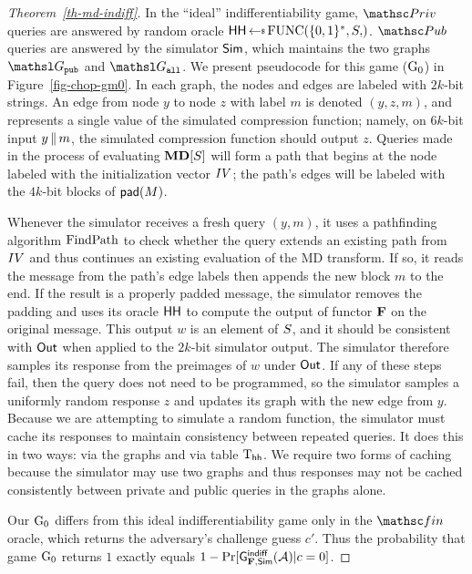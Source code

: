 \begin{proof}[Theorem~\ref{th-md-indiff}]
In the ``ideal'' indifferentiability game, $\PrivO$ queries are answered by random oracle $\HH\getsr \AllFuncs{\bits^*,\S}$.
$\PubO$ queries are answered by the simulator $\simulator$, which maintains the two graphs $\graph_{\public}$ and $\graph_{\all}$.
We present pseudocode for this game ($\Gm_0$) in Figure~\ref{fig-chop-gm0}.
In each graph, the nodes and edges are labeled with $2k$-bit strings.
An edge from node $y$ to node $z$ with label $m$ is denoted $(y, z, m)$, and represents a single value of the simulated compression function; namely, on $6k$-bit input $y \concat m$, the simulated compression function should output $z$.
Queries made in the process of evaluating $\construct{MD}[\S]$ will form a path that begins at the node labeled with the initialization vector $\IV$; the path's edges will be labeled with the $4k$-bit blocks of $\padF(\msg)$.
 
Whenever the simulator receives a fresh query $(y, m)$, it uses a pathfinding algorithm $\ppathO$ to check whether the query extends an existing path from $\IV$ and thus continues an
existing evaluation of the MD transform.
If so, it reads the message from the path's edge labels then appends the new block $m$ to the end.
If the result is a properly padded message, the simulator removes the padding and uses its oracle $\HH$ to compute the output of functor $\construct{F}$ on the original message.
This output $w$ is an element of $\S$, and it should be consistent with $\Out$ when applied to the $2k$-bit simulator output.
The simulator therefore samples its response from the preimages of $w$ under $\Out$.
If any of these steps fail, then the query does not need to be programmed, so the simulator samples a uniformly random response $z$ and updates its graph with the new edge from $y$.
Because we are attempting to simulate a random function, the simulator must cache its responses to maintain consistency between repeated queries.
It does this in two ways: via the graphs and via table $\Thh$. We require two forms of caching because the simulator may use two graphs and thus responses may not be cached consistently
between private and public queries in the graphs alone.

Our $\Gm_0$ differs from this ideal indifferentiability game only in the $\Finalize$ oracle, which returns the adversary's challenge guess $c'$. 
Thus the probability that game $\Gm_0$ returns $1$ exactly equals $1 - \Pr[\Gindiff_{\construct{F}, \simulator}(\advA) | c = 0]$.


\end{proof}
